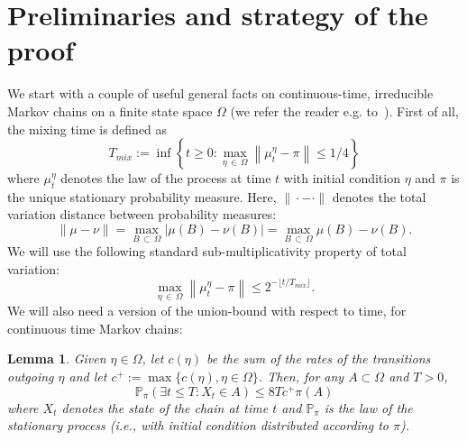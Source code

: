 \documentclass[10pt]{amsart}
\newtheorem{lemm}[theo]{Lemma}\newtheorem{prop}[theo]{Proposition}\newtheorem{coro}[theo]{Corollary}\newtheorem{conj}[theo]{Conjecture}
\theoremstyle{definition}\newtheorem{defi}[theo]{Definition}\newtheorem{rema}[theo]{Remark}\newtheorem{exam}[theo]{Example}\newtheorem{exem}[theo]{Example}\newtheorem{nota}[theo]{Notation}
\renewcommand{\P}{\mathbb{P}}
\let\oldexists\exists
\renewcommand*{\exists}{\mathrel{\oldexists}}
\begin{document}
\section{Preliminaries and strategy of the proof}\label{sec:prelsketch}
We start with a couple of useful general facts on continuous-time, irreducible Markov chains on a finite state space $\Omega$ (we refer the reader e.g. to~\cite{LP}). First of all, the mixing time is defined as
\begin{equation}\label{eq:defTmix}
T_{mix}:=\inf\left\{t\ge0: \max_{\eta\,\in\,\Omega}\left\|\mu_t^\eta-\pi\right\|\le 1/4\right\}
\end{equation}
where $\mu_t^\eta$ denotes the law of the process at time $t$ with initial condition $\eta$ and $\pi$ is the unique stationary probability measure. Here, $\|\cdot-\cdot\|$ denotes the total variation distance between probability measures:
\begin{equation}
\|\mu-\nu\|=\max_{B\,\subset\,\Omega}|\mu(B)-\nu(B)|=\max_{B\,\subset\,\Omega}\mu(B)-\nu(B).
\end{equation}
We will use the following standard sub-multiplicativity property of total variation:
\begin{equation}\label{eq:submult}
\max_{\eta\,\in\,\Omega}\left\|\mu_t^\eta-\pi\right\|\le 2^{-\lfloor t/T_{mix}\rfloor}.
\end{equation}
We will also need a version of the union-bound with respect to time, for continuous time Markov chains:
\begin{lemm}
Given $\eta\in \Omega$, let $c(\eta)$ be the sum of the rates of the transitions outgoing $\eta$ and let $c^+:=\max\{c(\eta),\eta\in\Omega\}$. Then, for any $A\subset \Omega$ and $T>0$,
\begin{equation}\label{eq:unionboundt}
\P_\pi(\exists t\le T: X_t\in A)\le 8Tc^+\pi(A)
\end{equation}
where $X_t$ denotes the state of the chain at time $t$ and $\P_\pi$ is the law of the stationary process (i.e., with initial condition distributed according to $\pi$).
\end{lemm}
\end{document}
